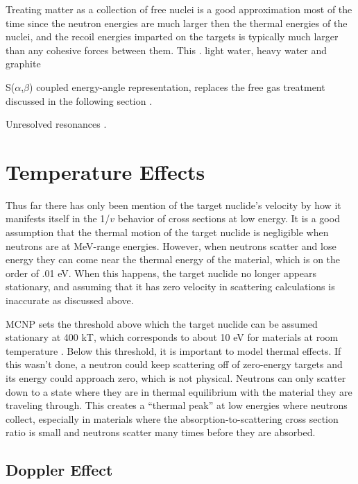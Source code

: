 Treating matter as a collection of free nuclei is a good approximation most of the time since the neutron energies are much larger then the thermal energies of the nuclei, and the recoil energies imparted on the targets is typically much larger than any cohesive forces between them.  This  \cite{jaakko}.
light water, heavy water and graphite

S($\alpha$,$\beta$) coupled energy-angle representation, replaces the free gas treatment discussed in the following section \cite{mcnp}.

Unresolved resonances \cite{mcnp}.


\section{Temperature Effects}
\label{sec:temp}

Thus far there has only been mention of the target nuclide's velocity by how it manifests itself in the 1/$v$ behavior of cross sections at low energy.  It is a good assumption that the thermal motion of the target nuclide is negligible when neutrons are at MeV-range energies.  However, when neutrons scatter and lose energy they can come near the thermal energy of the material, which is on the order of .01 eV.  When this happens, the target nuclide no longer appears stationary, and assuming that it has zero velocity in scattering calculations is inaccurate as discussed above. 

MCNP sets the threshold above which the target nuclide can be assumed stationary at 400 kT, which corresponds to about 10 eV for materials at room temperature \cite{mcnp}.  Below this threshold, it is important to model thermal effects.  If this wasn't done, a neutron could keep scattering off of zero-energy targets and its energy could approach zero, which is not physical.  Neutrons can only scatter down to a state where they are in thermal equilibrium with the material they are traveling through.  This creates a ``thermal peak'' at low energies where neutrons collect, especially in materials where the absorption-to-scattering cross section ratio is small and neutrons scatter many times before they are absorbed.

\subsection{Doppler Effect}


